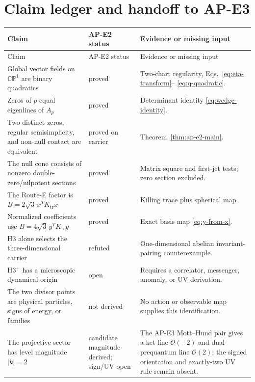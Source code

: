 \documentclass[11pt]{article}
\numberwithin{equation}{section}
\newcommand{\CP}{\mathbb{CP}}
\newcommand{\cO}{\mathcal O}
\newcommand{\Ktr}{K_{\mathrm{tr}}}
\newcommand{\status}[1]{\textsf{#1}}
\begin{document}
\section{Claim ledger and handoff to AP-E3}

\begin{longtable}{>{\raggedright\arraybackslash}p{}
                  >{\raggedright\arraybackslash}p{}
                  >{\raggedright\arraybackslash}p{}}
\toprule
Claim & AP-E2 status & Evidence or missing input\\
\midrule
\endfirsthead
\toprule
Claim & AP-E2 status & Evidence or missing input\\
\midrule
\endhead
Global vector fields on \(\CP^1\) are binary quadratics &
\status{proved} & Two-chart regularity, Eqs.~\eqref{eq:eta-transform}--
\eqref{eq:q-quadratic}.\\
Zeros of \(p\) equal eigenlines of \(A_p\) &
\status{proved} & Determinant identity \eqref{eq:wedge-identity}.\\
Two distinct zeros, regular semisimplicity, and non-null contact are
equivalent & \status{proved on carrier} &
Theorem~\ref{thm:ap-e2-main}.\\
The null cone consists of nonzero double-zero/nilpotent sections &
\status{proved} & Matrix square and first-jet tests; zero section excluded.\\
The Route-E factor is \(B=2\sqrt3\,x^T\Ktr x\) &
\status{proved} & Killing trace plus spherical map.\\
Normalized coefficients use \(B=4\sqrt3\,y^T\Ktr y\) &
\status{proved} & Exact basis map \eqref{eq:y-from-x}.\\
H3 alone selects the three-dimensional carrier &
\status{refuted} & One-dimensional abelian invariant-pairing counterexample.\\
H3$^+$ has a microscopic dynamical origin &
\status{open} & Requires a correlator, messenger, anomaly, or UV derivation.\\
The two divisor points are physical particles, signs of energy, or families &
\status{not derived} & No action or observable map supplies this identification.\\
The projective sector has level magnitude \(|k|=2\) &
\status{candidate magnitude derived; sign/UV open} & The AP-E3 Mott--Hund
pair gives a ket line \(\cO(-2)\) and dual prequantum line \(\cO(2)\);
the signed orientation and exactly-two UV rule remain absent.\\
\bottomrule
\end{longtable}
\end{document}
